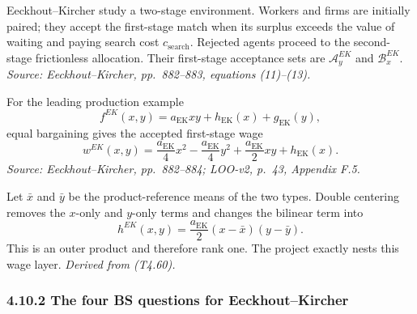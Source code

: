 \documentclass[11pt]{article}
\begin{document}
Eeckhout--Kircher study a two-stage environment.  Workers and firms are
initially paired; they accept the first-stage match when its surplus exceeds
the value of waiting and paying search cost \(c_{\mathrm{search}}\).  Rejected
agents proceed to the second-stage frictionless allocation.  Their first-stage
acceptance sets are \(\mathcal A_y^{EK}\) and
\(\mathcal B_x^{EK}\).
\textit{Source: Eeckhout--Kircher, pp.\ 882--883, equations (11)--(13).}

For the leading production example
\[
f^{EK}(x,y)
=
a_{\mathrm{EK}}xy
+h_{\mathrm{EK}}(x)
+g_{\mathrm{EK}}(y),
\tag{T4.59}
\]
equal bargaining gives the accepted first-stage wage
\[
w^{EK}(x,y)
=
\frac{a_{\mathrm{EK}}}{4}x^2
-\frac{a_{\mathrm{EK}}}{4}y^2
+\frac{a_{\mathrm{EK}}}{2}xy
+h_{\mathrm{EK}}(x).
\tag{T4.60}
\]
\textit{Source: Eeckhout--Kircher, pp.\ 882--884; LOO-v2, p.\ 43,
Appendix F.5.}

Let \(\bar x\) and \(\bar y\) be the product-reference means of the two types.
Double centering removes the \(x\)-only and \(y\)-only terms and changes the
bilinear term into
\[
h^{EK}(x,y)
=
\frac{a_{\mathrm{EK}}}{2}
(x-\bar x)(y-\bar y).
\tag{T4.61}
\]
This is an outer product and therefore rank one.  The project exactly nests
this wage layer.
\textit{Derived from (T4.60).}

\subsubsection{4.10.2 The four BS questions for Eeckhout--Kircher}
\end{document}
